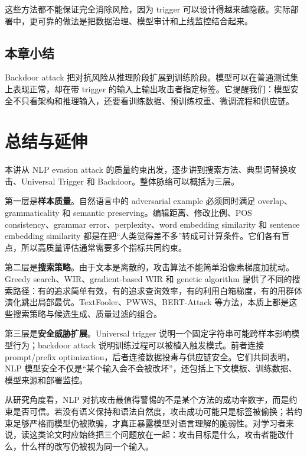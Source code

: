 \documentclass[a4paper]{article}
\begin{document}
这些方法都不能保证完全消除风险，因为 trigger 可以设计得越来越隐蔽。实际部署中，更可靠的做法是把数据治理、模型审计和上线监控结合起来。

\subsection{本章小结}

Backdoor attack 把对抗风险从推理阶段扩展到训练阶段。模型可以在普通测试集上表现正常，却在带 trigger 的输入上输出攻击者指定标签。它提醒我们：模型安全不只看架构和推理输入，还要看训练数据、预训练权重、微调流程和供应链。

\section{总结与延伸}

本讲从 NLP evasion attack 的质量约束出发，逐步讲到搜索方法、典型词替换攻击、Universal Trigger 和 Backdoor。整体脉络可以概括为三层。

第一层是\textbf{样本质量}。自然语言中的 adversarial example 必须同时满足 overlap、grammaticality 和 semantic preserving。编辑距离、修改比例、POS consistency、grammar error、perplexity、word embedding similarity 和 sentence embedding similarity 都是在把“人类觉得差不多”转成可计算条件。它们各有盲点，所以高质量评估通常需要多个指标共同约束。

第二层是\textbf{搜索策略}。由于文本是离散的，攻击算法不能简单沿像素梯度加扰动。Greedy search、WIR、gradient-based WIR 和 genetic algorithm 提供了不同的搜索路径：有的追求简单有效，有的追求查询效率，有的利用白箱梯度，有的用群体演化跳出局部最优。TextFooler、PWWS、BERT-Attack 等方法，本质上都是这些搜索策略与候选生成、质量过滤的组合。

第三层是\textbf{安全威胁扩展}。Universal trigger 说明一个固定字符串可能跨样本影响模型行为；backdoor attack 说明训练过程可以被植入触发模式。前者连接 prompt/prefix optimization，后者连接数据投毒与供应链安全。它们共同表明，NLP 模型安全不仅是“某个输入会不会被改坏”，还包括上下文模板、训练数据、模型来源和部署监控。

从研究角度看，NLP 对抗攻击最值得警惕的不是某个方法的成功率数字，而是约束是否可信。若没有语义保持和语法自然度，攻击成功可能只是标签被偷换；若约束足够严格而模型仍被欺骗，才真正暴露模型对语言理解的脆弱性。对学习者来说，读这类论文时应始终把三个问题放在一起：攻击目标是什么，攻击者能改什么，什么样的改写仍被视为同一个输入。
\end{document}
